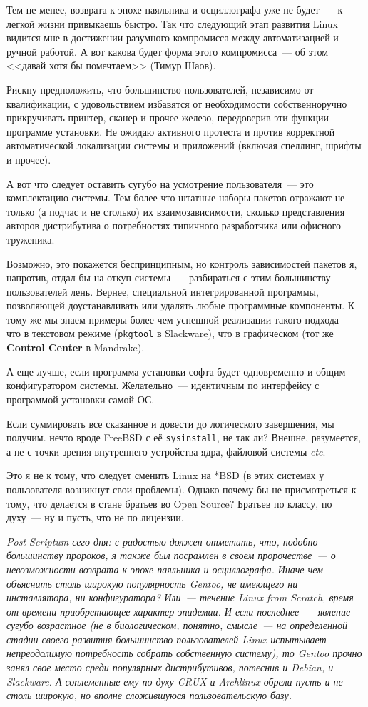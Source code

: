 Тем не менее, возврата к эпохе паяльника и осциллографа уже не будет~--- к легкой жизни привыкаешь быстро. Так что следующий этап развития Linux видится мне в достижении разумного компромисса между автоматизацией и ручной работой. А вот какова будет форма этого компромисса~--- об этом <<давай хотя бы помечтаем>> (Тимур Шаов).

Рискну предположить, что большинство пользователей, независимо от квалификации, с удовольствием избавятся от необходимости собственноручно прикручивать принтер, сканер и прочее железо, передоверив эти функции программе установки. Не ожидаю активного протеста и против корректной автоматической локализации системы и приложений (включая спеллинг, шрифты и прочее).

А вот что следует оставить сугубо на усмотрение пользователя~--- это комплектацию системы. Тем более что штатные наборы пакетов отражают не только (а подчас и не столько) их взаимозависимости, сколько представления авторов дистрибутива о потребностях типичного разработчика или офисного труженика.

Возможно, это покажется беспринципным, но контроль зависимостей пакетов я, напротив, отдал бы на откуп системы~--- разбираться с этим большинству пользователей лень. Вернее, специальной интегрированной программы, позволяющей доустанавливать или удалять любые программные компоненты. К тому же мы знаем примеры более чем успешной реализации такого подхода~--- что в текстовом режиме (\texttt{pkgtool} в Slackware), что в графическом (тот же \textbf{Control Center} в Mandrake).

А еще лучше, если программа установки софта будет одновременно и общим конфигуратором системы. Желательно~--- идентичным по интерфейсу с программой установки самой ОС.

Если суммировать все сказанное и довести до логического завершения, мы получим. нечто вроде FreeBSD с её \texttt{sysinstall}, не так ли? Внешне, разумеется, а не с точки зрения внутреннего устройства ядра, файловой системы \textit{etc}.

Это я не к тому, что следует сменить Linux на *BSD (в этих системах у пользователя возникнут свои проблемы). Однако почему бы не присмотреться к тому, что делается в стане братьев во Open Source? Братьев по классу, по духу~--- ну и пусть, что не по лицензии.

\textsl{Post Scriptum сего дня: с радостью должен отметить, что, подобно большинству пророков, я также был посрамлен в своем пророчестве~--- о невозможности возврата к эпохе паяльника и осциллографа. Иначе чем объяснить столь широкую популярность Gentoo, не имеющего ни инсталлятора, ни конфигуратора? Или~--- течение Linux from Scratch, время от времени приобретающее характер эпидемии. И если последнее~--- явление сугубо возрастное (не в биологическом, понятно, смысле~--- на определенной стадии своего развития большинство пользователей Linux испытывает непреодолимую потребность собрать собственную систему), то Gentoo прочно занял свое место среди популярных дистрибутивов, потеснив и Debian, и Slackware. А соплеменные ему по духу CRUX и Archlinux обрели пусть и не столь широкую, но вполне сложившуюся пользовательскую базу.}

